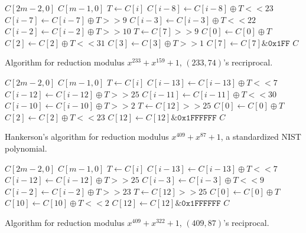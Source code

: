  \begin{algorithm}
 \begin{algorithmic}[1]
  \REQUIRE $C[2m-2,0]$
  \ENSURE $C[m-1,0]$
    \STATE $T \gets C[i]$
    \STATE $C[i-8] \gets C[i-8] \oplus T << 23$
    \STATE $C[i-7] \gets C[i-7] \oplus T >> 9$
    \STATE $C[i-3] \gets C[i-3] \oplus T << 22$
    \STATE $C[i-2] \gets C[i-2] \oplus T >> 10$
  \ENDFOR
  \STATE $T \gets C[7] >> 9$
  \STATE $C[0] \gets C[0] \oplus T$
  \STATE $C[2] \gets C[2] \oplus T << 31$
  \STATE $C[3] \gets C[3] \oplus T >> 1$
  \STATE $C[7] \gets C[7] \& \texttt{0x1FF}$
  \RETURN $C$
  \caption{Algorithm for reduction modulus $x^{233} + x^{159} + 1$, $(233, 74)$'s recriprocal.}
  \label{alg:233_159}
\end{algorithmic}
\end{algorithm}

\begin{algorithm}
\begin{algorithmic}[1]
  \REQUIRE $C[2m-2,0]$
  \ENSURE $C[m-1,0]$
    \STATE $T \gets C[i]$
    \STATE $C[i-13] \gets C[i-13] \oplus T << 7$
    \STATE $C[i-12] \gets C[i-12] \oplus T >> 25$
    \STATE $C[i-11] \gets C[i-11] \oplus T << 30$
    \STATE $C[i-10] \gets C[i-10] \oplus T >> 2$
  \ENDFOR
  \STATE $T \gets C[12] >> 25$
  \STATE $C[0] \gets C[0] \oplus T$
  \STATE $C[2] \gets C[2] \oplus T << 23$
  \STATE $C[12] \gets C[12] \& \texttt{0x1FFFFFF}$
  \RETURN $C$
  \caption{Hankerson's algorithm for reduction modulus $x^{409} + x^{87} + 1$, a standardized NIST polynomial.}
  \label{alg:409_87_nist}
\end{algorithmic}
\end{algorithm}


\begin{algorithm}
\begin{algorithmic}[1]
  \REQUIRE $C[2m-2,0]$
  \ENSURE $C[m-1,0]$
    \STATE $T \gets C[i]$
    \STATE $C[i-13] \gets C[i-13] \oplus T << 7$
    \STATE $C[i-12] \gets C[i-12] \oplus T >> 25$
    \STATE $C[i-3] \gets C[i-3] \oplus T << 9$
    \STATE $C[i-2] \gets C[i-2] \oplus T >> 23$
  \ENDFOR
  \STATE $T \gets C[12] >> 25$
  \STATE $C[0] \gets C[0] \oplus T$
  \STATE $C[10] \gets C[10] \oplus T << 2$
  \STATE $C[12] \gets C[12] \& \texttt{0x1FFFFFF}$
  \RETURN $C$
  \caption{Algorithm for reduction modulus $x^{409} + x^{322} + 1$, $(409, 87)$'s reciprocal.}
  \label{alg:409_322}
\end{algorithmic}
\end{algorithm}

